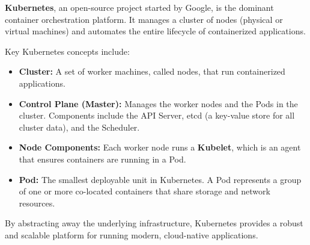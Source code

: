 \textbf{Kubernetes}, an open-source project started by Google, is the dominant container orchestration platform. It manages a cluster of nodes (physical or virtual machines) and automates the entire lifecycle of containerized applications.

Key Kubernetes concepts include:
\begin{itemize}
    \item \textbf{Cluster:} A set of worker machines, called nodes, that run containerized applications.
    \item \textbf{Control Plane (Master):} Manages the worker nodes and the Pods in the cluster. Components include the API Server, etcd (a key-value store for all cluster data), and the Scheduler.
    \item \textbf{Node Components:} Each worker node runs a \textbf{Kubelet}, which is an agent that ensures containers are running in a Pod.
    \item \textbf{Pod:} The smallest deployable unit in Kubernetes. A Pod represents a group of one or more co-located containers that share storage and network resources.
\end{itemize}
By abstracting away the underlying infrastructure, Kubernetes provides a robust and scalable platform for running modern, cloud-native applications.